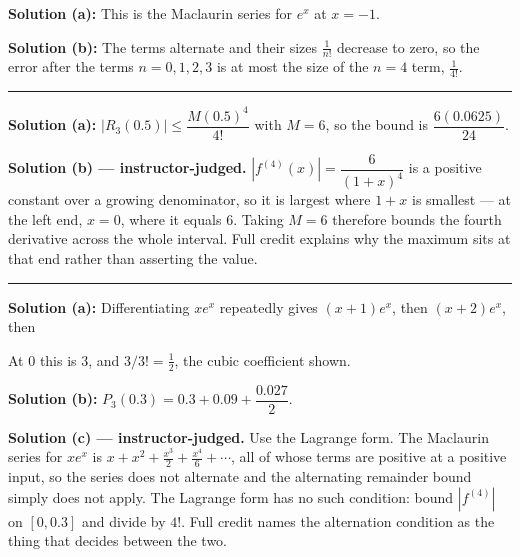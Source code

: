 \documentclass[12pt]{article}
\begin{document}

\textbf{Solution (a):} This is the Maclaurin series for $e^{x}$ at $x = -1$. 

\textbf{Solution (b):} The terms alternate and their sizes $\frac{1}{n!}$ decrease to zero, so the error after the terms $n = 0,1,2,3$ is at most the size of the $n = 4$ term, $\frac{1}{4!}$. 

\vspace{0.2cm}\noindent\rule{\linewidth}{0.2pt}\vspace{0.2cm}


\textbf{Solution (a):} $|R_3(0.5)| \le \dfrac{M(0.5)^{4}}{4!}$ with $M = 6$, so the bound is $\dfrac{6(0.0625)}{24}$. 

\textbf{Solution (b) --- instructor-judged.} $|f^{(4)}(x)| = \dfrac{6}{(1+x)^{4}}$ is a positive constant over a growing denominator, so it is largest where $1+x$ is smallest --- at the left end, $x = 0$, where it equals $6$. Taking $M = 6$ therefore bounds the fourth derivative across the whole interval. Full credit explains why the maximum sits at that end rather than asserting the value.

\vspace{0.2cm}\noindent\rule{\linewidth}{0.2pt}\vspace{0.2cm}


\textbf{Solution (a):} Differentiating $xe^{x}$ repeatedly gives $(x+1)e^{x}$, then $(x+2)e^{x}$, then 

At $0$ this is $3$, and $3/3! = \frac12$, the cubic coefficient shown.

\textbf{Solution (b):} $P_3(0.3) = 0.3 + 0.09 + \dfrac{0.027}{2}$. 

\textbf{Solution (c) --- instructor-judged.} Use the Lagrange form. The Maclaurin series for $xe^{x}$ is $x + x^{2} + \frac{x^{3}}{2} + \frac{x^{4}}{6} + \cdots$, all of whose terms are positive at a positive input, so the series does not alternate and the alternating remainder bound simply does not apply. The Lagrange form has no such condition: bound $|f^{(4)}|$ on $[0, 0.3]$ and divide by $4!$. Full credit names the alternation condition as the thing that decides between the two.
\end{document}
